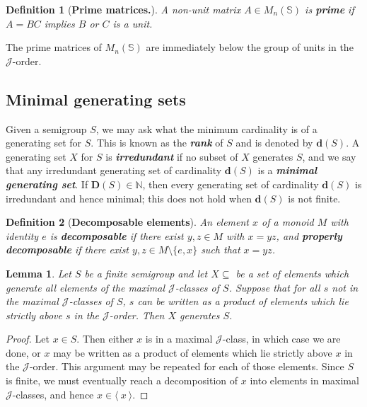 \documentclass[11pt]{article}
\newtheorem{lemma}[thm]{Lemma}
\newtheorem*{defi}{Definition}
\newenvironment{de}[1][]{\begin{defi}[#1]\rm}{\end{defi}}
\newcommand{\defn}[1]{\textbf{\textit{#1}}}
\numberwithin{equation}{section}
\newcommand{\genset}[1]{\ensuremath{\langle\: #1 \:\rangle}}
\newcommand{\J}{\mathscr{J}}
\newcommand{\N}{\mathbb{N}}
\begin{document}
\begin{de}[\textbf{Prime matrices.}]
  A non-unit matrix $A \in M_n(\mathbb{S})$ is \defn{prime} if $A = BC$ implies $B$ or
  $C$ is a unit.
\end{de}

The prime matrices of $M_n(\mathbb{S})$ are immediately below the group of units
in the $\J$-order. 


\subsection{Minimal generating sets}

Given a semigroup $S$, we may ask what the minimum cardinality is of a
generating set for $S$. This is known as the \defn{rank} of $S$ and is denoted
by $\mathbf{d}(S)$. A generating set $X$ for $S$ is \defn{irredundant} if no
subset of $X$ generates $S$, and we say that any irredundant generating set of
cardinality $\mathbf{d}(S)$ is a \defn{minimal generating set}. If
$\mathbf{D}(S) \in \N$, then every generating set of cardinality $\mathbf{d}(S)$
is irredundant and hence minimal; this does not hold when $\mathbf{d}(S)$ is not
finite.

\begin{de}[\textbf{Decomposable elements}]
  An element $x$ of a monoid $M$ with identity $e$ is \defn{decomposable} if
  there exist $y, z \in M$ with $x = yz$, and \defn{properly decomposable} if
  there exist $y, z \in M\setminus\{e, x\}$ such that $x = yz$.
\end{de}

\begin{lemma}
  Let $S$ be a finite semigroup and let $X \subseteq$ be a set of elements which
  generate all elements of the maximal $\J$-classes of $S$. Suppose that for all
  $s$ not in the maximal $\J$-classes of $S$, $s$ can be written as a product of
  elements which lie strictly above $s$ in the $\J$-order. Then $X$ generates
  $S$. 
\end{lemma}
\begin{proof}
  Let $x \in S$. Then either $x$ is in a maximal $\J$-class, in which case we
  are done, or $x$ may be written as a product of elements which lie strictly
  above $x$ in the $\J$-order. This argument may be repeated for each of those
  elements. Since $S$ is finite, we must eventually reach a decomposition of $x$
  into elements in maximal $\J$-classes, and hence $x \in \genset{x}$.
\end{proof}
\end{document}
